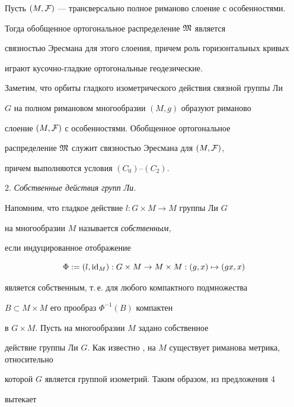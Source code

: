 \begin{prop}\label{pr1}


Пусть $(M,\cal F)$ --- трансверсально полное риманово слоение с особенностями.


Тогда обобщенное ортогональное распределение $\frak M$ является


связностью Эресмана для этого слоения, причем роль горизонтальных кривых


играют кусочно-гладкие ортогональные геодезические.


\end{prop}





Заметим, что орбиты гладкого изометрического действия связной группы Ли


$G$ на полном римановом многообразии $(M,g)$ образуют риманово


слоение $(M,\cal F)$ с особенностями. Обобщенное ортогональное


распределение $\frak M$ служит связностью Эресмана для $(M,\cal F)$,


причем выполняются условия $(C_0)$--$(C_2)$.


\medskip





2. {\it Собственные действия групп Ли.}


Напомним, что гладкое действие $l: G\times M\to M$ группы Ли $G$


на многообразии $M$ называется {\it собственным,}


если индуцированное отображение


$$


\Phi:=(l,\id_M):


G\times M\to M\times M: (g,x)\mapsto (g x, x)


$$


является собственным, т.\,е. для любого компактного подмножества


$B\subset M\times M$ его прообраз $\Phi^{-1}(B)$ компактен


в $G\times M$.  Пусть на многообразии $M$ задано собственное


действие группы Ли $G$. Как известно \cite{Mic}, на $M$ существует риманова метрика, относительно


которой $G$ является группой изометрий. Таким образом, из предложения 4


вытекает





